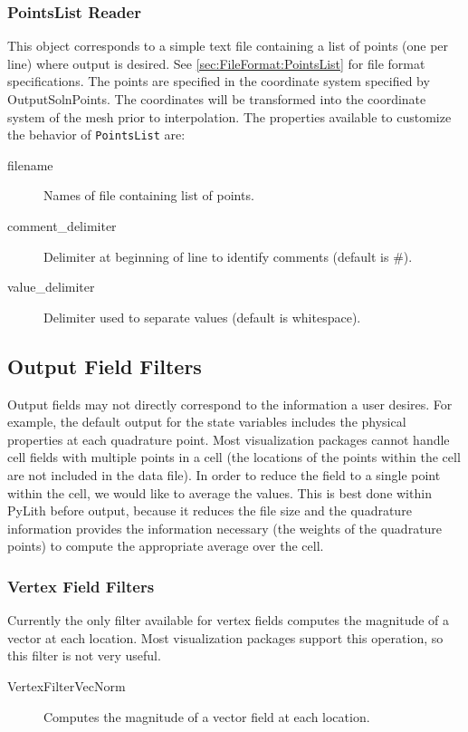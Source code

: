 \subsubsection{PointsList Reader}

This object corresponds to a simple text file containing a list of
points (one per line) where output is desired. See \vref{sec:FileFormat:PointsList}
for file format specifications. The points are specified in the coordinate
system specified by OutputSolnPoints. The coordinates will be transformed
into the coordinate system of the mesh prior to interpolation. The
properties available to customize the behavior of \texttt{PointsList}
are:
\begin{description}
\item [{filename}] Names of file containing list of points.
\item [{comment\_delimiter}] Delimiter at beginning of line to identify
comments (default is \#).
\item [{value\_delimiter}] Delimiter used to separate values (default is
whitespace).
\end{description}

\subsection{Output Field Filters}

Output fields may not directly correspond to the information a user
desires. For example, the default output for the state variables includes
the physical properties at each quadrature point. Most visualization
packages cannot handle cell fields with multiple points in a cell
(the locations of the points within the cell are not included in the
data file). In order to reduce the field to a single point within
the cell, we would like to average the values. This is best done within
PyLith before output, because it reduces the file size and the quadrature
information provides the information necessary (the weights of the
quadrature points) to compute the appropriate average over the cell.


\subsubsection{\label{sub:vertex:field:filters}Vertex Field Filters}

Currently the only filter available for vertex fields computes the
magnitude of a vector at each location. Most visualization packages
support this operation, so this filter is not very useful.
\begin{description}
\item [{VertexFilterVecNorm}] Computes the magnitude of a vector field
at each location.
\end{description}

